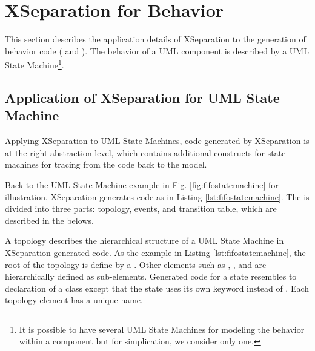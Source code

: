 \section{XSeparation for Behavior}
\label{sec:xseparationbehavior}
This section describes the application details of XSeparation to the generation of behavior code ( and ).
The behavior of a UML component is described by a UML State Machine\footnote{It is possible to have several UML State Machines for modeling the behavior within a component but for simplication, we consider only one.}.







\subsection{Application of XSeparation for UML State Machine}
Applying XSeparation to UML State Machines, code generated by XSeparation is at the right abstraction level, which contains additional constructs for state machines for tracing from the code back to the model.
 
Back to the UML State Machine example in Fig. \ref{fig:fifostatemachine} for illustration, XSeparation generates code as in Listing \ref{lst:fifostatemachine}.
The  is divided into three parts: topology, events, and transition table, which are described in the belows.




\vskip 0.2cm
\noindent
{}
A topology describes the hierarchical structure of a UML State Machine in XSeparation-generated code.
As the example in Listing \ref{lst:fifostatemachine}, the root of the topology is define by a .
Other elements such as , , and  are hierarchically defined as sub-elements.
Generated code for a state resembles to declaration of a class except that the state uses its own keyword  instead of .
Each topology element has a unique name.

